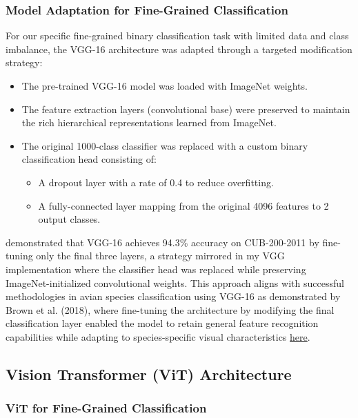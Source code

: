 \documentclass[a4paper,12pt]{article}
\begin{document}
\subsubsection{Model Adaptation for Fine-Grained Classification}

For our specific fine-grained binary classification task with limited data and class imbalance, the VGG-16 architecture was adapted through a targeted modification strategy:

\begin{itemize}
    \item The pre-trained VGG-16 model was loaded with ImageNet weights.
    \item The feature extraction layers (convolutional base) were preserved to maintain the rich hierarchical representations learned from ImageNet.
    \item The original 1000-class classifier was replaced with a custom binary classification head consisting of: 
    \begin{itemize}
        \item A dropout layer with a rate of 0.4 to reduce overfitting.
        \item A fully-connected layer mapping from the original 4096 features to 2 output classes.
    \end{itemize}
\end{itemize}

\citep{zhang2019bird} demonstrated that VGG-16 achieves 94.3\% accuracy on CUB-200-2011 by fine-tuning only the final three layers, a strategy mirrored in my VGG implementation where the classifier head was replaced while preserving ImageNet-initialized convolutional weights.
This approach aligns with successful methodologies in avian species classification using VGG-16 as demonstrated by Brown et al. (2018), where fine-tuning the architecture by modifying the final classification layer enabled the model to retain general feature recognition capabilities while adapting to species-specific visual characteristics \href{https://ieeexplore.ieee.org/stamp/stamp.jsp?tp=&arnumber=10533638&tag=}{here}.

\subsection{Vision Transformer (ViT) Architecture}

\subsubsection{ViT for Fine-Grained Classification}
\end{document}
